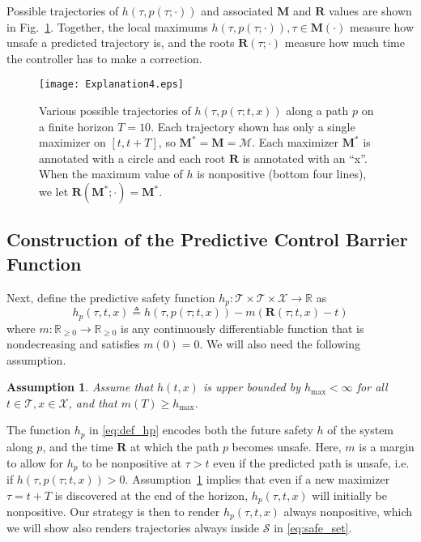 \documentclass[10pt,conference]{ieeeconf}
\renewcommand{\(}{\left(}
\renewcommand{\)}{\right)}
\renewcommand{\[}{\left[}
\renewcommand{\]}{\right]}
\newcommand{\reals}{\mathbb{R}}
\newtheorem{assumption}{Assumption}
\newcommand{\extendedversion}[1]{{\color{black}#1}}
\begin{document}
{Possible trajectories of $h(\tau,p(\tau;\cdot))$ and associated $\boldsymbol{M}$ and $\boldsymbol{R}$ values are shown in Fig.~\ref{fig:explanation}.}
{Together, the local maximums $h(\tau,p(\tau;\cdot)), \tau\in\boldsymbol{M}(\cdot)$ measure how unsafe a predicted trajectory is, and the roots $\boldsymbol{R}(\tau;\cdot)$ measure how much time the controller has to make a correction.}
%
\begin{figure}
    \centering
    \texttt{[image: Explanation4.eps]}
    \caption{Various possible trajectories of $h(\tau,p(\tau;t,x))$ along a path $p$ on a finite horizon {$T=10$}. Each trajectory shown has only a single maximizer on $[t,t+T]$, so $\boldsymbol{M}^* = \boldsymbol{M}{=\mathscr{M}}$. Each maximizer $\boldsymbol{M}^*$ is annotated with a circle and each root $\boldsymbol{R}$ is annotated with an ``x''. When the maximum value of $h$ is nonpositive (bottom four lines), we let $\boldsymbol{R}(\boldsymbol{M}^*;\cdot) = \boldsymbol{M}^*$.}
    \label{fig:explanation}
    \vspace{-12pt}
\end{figure}


\subsection{Construction of the Predictive Control Barrier Function} \label{sec:method_c}


Next, define {the predictive safety function} $h_p:\mathcal{T}\times\mathcal{T}\times\mathcal{X}\rightarrow\reals$ as
\begin{equation}
    h_p(\tau,t,x) \triangleq h(\tau,p(\tau;t,x)) - m(\boldsymbol{R}(\tau;t,x) - t) \label{eq:def_hp}
\end{equation}
where $m:\reals_{\geq 0}\rightarrow\reals_{\geq 0}$ is any continuously differentiable function that is nondecreasing and satisfies $m(0) = 0$.
We will also need the following assumption.
%
\begin{assumption}%
\label{as:h_max}
Assume that $h(t,x)$ is upper bounded by $h_\textrm{max}<\infty$ for all $t\in\mathcal{T},x\in\mathcal{X}$, and that 
$m(T) \geq h_\textrm{max}$. 
\end{assumption}
%
The function $h_p$ in \eqref{eq:def_hp} encodes both the future safety {$h$} of the system along $p$, and the time {$\boldsymbol{R}$} at which the path $p$ becomes unsafe. Here, $m$ is a margin to allow for $h_p$ to be nonpositive at $\tau > t$ even if the predicted path is unsafe, i.e. if $h(\tau,p(\tau;t,x)) > 0$. Assumption~\ref{as:h_max} implies that {even if a new maximizer $\tau=t+T$} is discovered at the end of the horizon, $h_p(\tau,t,x)$ will initially be nonpositive. \extendedversion{Our strategy is then to render $h_p(\tau,t,x)$ always nonpositive, which we will show also renders trajectories always inside $\mathcal{S}$ in \eqref{eq:safe_set}.}
\end{document}
